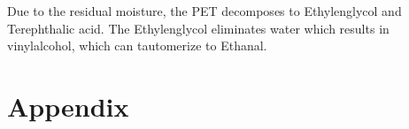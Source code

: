 \documentclass[10pt,a4paper,ngerman]{scrartcl}
\begin{document}
            Due to the residual moisture, the PET decomposes to Ethylenglycol and Terephthalic acid. 
            The Ethylenglycol eliminates water which results in vinylalcohol, which can tautomerize to Ethanal.


\section{Appendix}








\printbibliography
\end{document}
